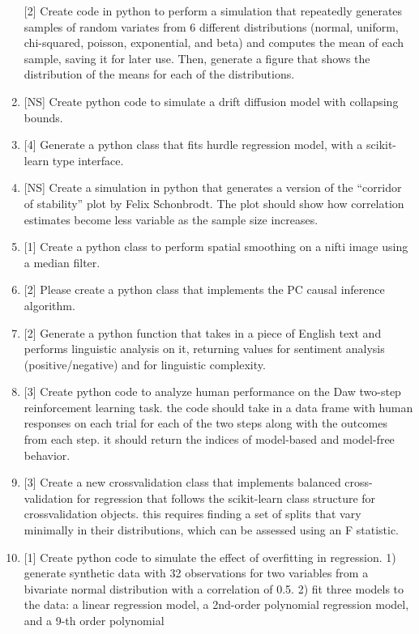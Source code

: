 \documentclass[
]{article}
\begin{document}
\begin{enumerate}
  {[}2{]} Create code in python to perform a simulation that repeatedly
  generates samples of random variates from 6 different distributions
  (normal, uniform, chi-squared, poisson, exponential, and beta) and
  computes the mean of each sample, saving it for later use. Then,
  generate a figure that shows the distribution of the means for each of
  the distributions.
\item
  {[}NS{]} Create python code to simulate a drift diffusion model with
  collapsing bounds.
\item
  {[}4{]} Generate a python class that fits hurdle regression model,
  with a scikit-learn type interface.
\item
  {[}NS{]} Create a simulation in python that generates a version of the
  ``corridor of stability'' plot by Felix Schonbrodt. The plot should
  show how correlation estimates become less variable as the sample size
  increases.
\item
  {[}1{]} Create a python class to perform spatial smoothing on a nifti
  image using a median filter.
\item
  {[}2{]} Please create a python class that implements the PC causal
  inference algorithm.
\item
  {[}2{]} Generate a python function that takes in a piece of English
  text and performs linguistic analysis on it, returning values for
  sentiment analysis (positive/negative) and for linguistic complexity.
\item
  {[}3{]} Create python code to analyze human performance on the Daw
  two-step reinforcement learning task. the code should take in a data
  frame with human responses on each trial for each of the two steps
  along with the outcomes from each step. it should return the indices
  of model-based and model-free behavior.
\item
  {[}3{]} Create a new crossvalidation class that implements balanced
  cross-validation for regression that follows the scikit-learn class
  structure for crossvalidation objects. this requires finding a set of
  splits that vary minimally in their distributions, which can be
  assessed using an F statistic.
\item
  {[}1{]} Create python code to simulate the effect of overfitting in
  regression. 1) generate synthetic data with 32 observations for two
  variables from a bivariate normal distribution with a correlation of
  0.5. 2) fit three models to the data: a linear regression model, a
  2nd-order polynomial regression model, and a 9-th order polynomial

\end{enumerate}
\end{document}
